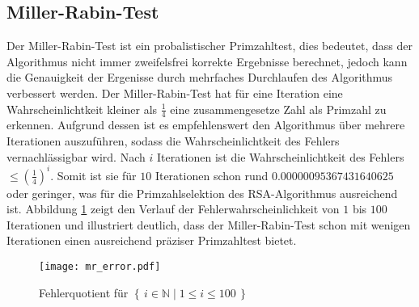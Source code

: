 \subsection{Miller-Rabin-Test}

Der Miller-Rabin-Test ist ein probalistischer Primzahltest, dies bedeutet, dass der Algorithmus nicht immer zweifelsfrei korrekte Ergebnisse berechnet, jedoch kann die Genauigkeit der Ergenisse durch mehrfaches Durchlaufen des Algorithmus verbessert werden.
Der Miller-Rabin-Test hat für eine Iteration eine Wahrscheinlichtkeit kleiner als $\frac{1}{4}$ eine zusammengesetze Zahl als Primzahl zu erkennen. Aufgrund dessen ist es empfehlenswert den Algorithmus über mehrere Iterationen auszuführen, sodass die Wahrscheinlichtkeit des Fehlers vernachlässigbar wird.
Nach $i$ Iterationen ist die Wahrscheinlichtkeit des Fehlers $\le(\frac{1}{4})^i$. Somit ist sie für $10$ Iterationen schon rund $0.00000095367431640625$ oder geringer, was für die Primzahlselektion des RSA-Algorithmus ausreichend ist. Abbildung \ref{mr_error} zeigt den Verlauf der Fehlerwahrscheinlichkeit von $1$ bis $100$ Iterationen und illustriert deutlich, dass der Miller-Rabin-Test schon mit wenigen Iterationen einen ausreichend präziser Primzahltest bietet.\cite{rabin01}

\begin{figure}[ht]
  \texttt{[image: mr\_error.pdf]}
  \label{mr_error}
  \caption{Fehlerquotient für $\left\{\,i \in \mathbb{N}\mid 1 \le i \le 100 \, \right\}$}
\end{figure}
